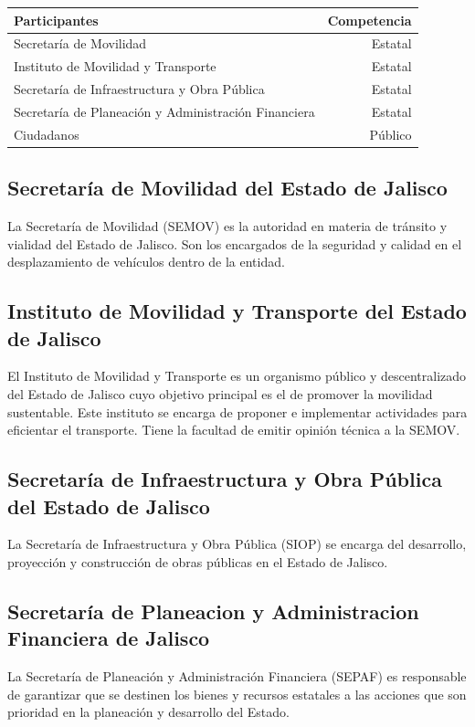 \documentclass{article}
\begin{document}
\begin{table}[H]\centering
\begin{tabular}{l r}
\hline
Participantes & Competencia \\
\hline\hline
Secretaría de Movilidad & Estatal \\
Instituto de Movilidad y Transporte & Estatal \\
Secretaría de Infraestructura y Obra Pública & Estatal \\
Secretaría de Planeación y Administración Financiera & Estatal\\
Ciudadanos & Público \\

\hline
\end{tabular}
\end{table}

\subsection[SEMOV]{Secretaría de Movilidad del Estado de Jalisco}\label{subsec:semov}

La Secretaría de Movilidad (SEMOV) es la autoridad en materia de tránsito y vialidad del Estado de Jalisco. Son los encargados de la seguridad y calidad en el desplazamiento de vehículos dentro de la entidad. 

\subsection[IMTJ]{Instituto de Movilidad y Transporte del Estado de Jalisco}\label{subsec:imtj}

El Instituto de Movilidad y Transporte es un organismo público y descentralizado del Estado de Jalisco cuyo objetivo principal es el de promover la movilidad sustentable. Este instituto se encarga de proponer e implementar actividades para eficientar el transporte. Tiene la facultad de emitir opinión técnica a la SEMOV. 

\subsection[SIOP]{Secretaría de Infraestructura y Obra Pública del Estado de Jalisco}\label{subsec:siop}

La Secretaría de Infraestructura y Obra Pública (SIOP) se encarga del desarrollo, proyección y construcción de obras públicas en el Estado de Jalisco. 

\subsection[SEPAF]{Secretaría de Planeacion y Administracion Financiera de Jalisco}\label{subsec:sepaf}
La Secretaría de Planeación y Administración Financiera (SEPAF) es responsable de garantizar que se destinen los bienes y recursos estatales a las acciones que son prioridad en la planeación y desarrollo del Estado. 
\end{document}
